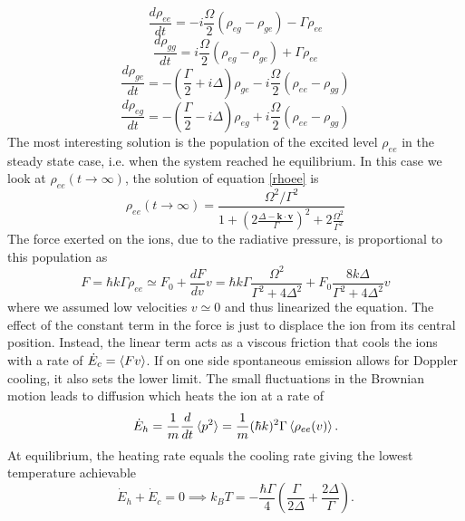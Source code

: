 \begin{equation}
\label{rhoee}
\frac{d\rho_{ee}}{dt} = -i\frac{\Omega}{2}(\rho_{eg} - \rho_{ge}) - \Gamma \rho_{ee}
\end{equation}
\begin{equation}
\frac{d\rho_{gg}}{dt} = i\frac{\Omega}{2}(\rho_{eg} - \rho_{ge}) + \Gamma \rho_{ee}
\end{equation}
\begin{equation}
\frac{d\rho_{ge}}{dt} = -\left(\frac{\Gamma}{2}+i\Delta\right)\rho_{ge} -i\frac{\Omega}{2}(\rho_{ee} - \rho_{gg})
\end{equation}
\begin{equation}
\frac{d\rho_{eg}}{dt} = -\left(\frac{\Gamma}{2}-i\Delta\right)\rho_{eg}+i\frac{\Omega}{2}(\rho_{ee} - \rho_{gg})
\end{equation}
The most interesting solution is the population of the excited level $\rho_{ee}$ in the steady state case, i.e. when the system reached he equilibrium. In this case we look at $\rho_{ee}(t\to \infty) $, the solution of equation \eqref{rhoee} is
\begin{equation}
\rho_{ee}(t\to \infty) = \frac{\Omega^2/\Gamma^2}{1 + \left(2\frac{\Delta -\mathbf{k}\cdot \mathbf{v}}{\Gamma}\right)^2 + 2\frac{\Omega^2}{\Gamma^2}}
\end{equation}
The force exerted on the ions, due to the radiative pressure, is proportional to this population as
\begin{equation}
F = \hbar k \Gamma \rho_{ee} \simeq F_0 + \frac{dF}{dv}v = \hbar k \Gamma\frac{\Omega^2}{\Gamma^2 +4\Delta^2} + F_0 \frac{8k\Delta}{\Gamma^2 + 4\Delta^2}v
\end{equation}
where we assumed low velocities $v \simeq 0$ and thus linearized the equation. The effect of the constant term in the force is just to displace the ion from its central position. Instead, the linear term acts as a viscous friction that cools the ions with a rate of $\dot{E}_c = \braket{Fv}$.
If on one side spontaneous emission allows for Doppler cooling, it also sets the lower limit. The small fluctuations in the Brownian motion leads to diffusion which heats the ion at a rate of
\begin{equation}
\dot{E}_h = \frac{1}{m}\frac{d}{dt}\braket{p^2} =  \frac{1}{m}(\hbar k)^2 \Gamma \braket{\rho_{ee}(v)}.
\end{equation}
At equilibrium, the heating rate equals the cooling rate giving the lowest temperature achievable
\begin{equation}
\dot{E}_h + \dot{E}_c = 0  \implies k_B T = -\frac{\hbar \Gamma}{4}\left(\frac{\Gamma}{2\Delta} +\frac{2\Delta}{\Gamma}\right).
\end{equation}
